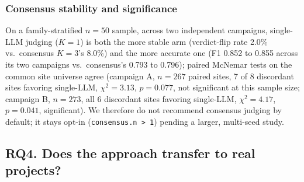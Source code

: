 \documentclass[a4paper]{llncs}
\begin{document}
\subsubsection{Consensus stability and significance}
\label{sec:eval-consensus}

On a family-stratified $n{=}50$ sample, across two independent
campaigns, single-LLM judging ($K{=}1$) is both the more stable arm
(verdict-flip rate 2.0\% vs.\ consensus $K{=}3$'s 8.0\%) and the more
accurate one (F1 0.852 to 0.855 across its two campaigns vs.\
consensus's 0.793 to 0.796); paired McNemar tests on the common site
universe agree (campaign A, $n{=}267$ paired sites, 7 of 8 discordant
sites favoring single-LLM, $\chi^2 = 3.13$, $p = 0.077$, not
significant at this sample size; campaign B, $n{=}273$, all 6
discordant sites favoring single-LLM, $\chi^2 = 4.17$, $p = 0.041$,
significant).
We
therefore do not recommend consensus judging by default; it
stays opt-in
(\texttt{consensus.n~>~1}) pending a larger, multi-seed study.

\noindent{}

\subsection{RQ4. Does the approach transfer to real projects?}
\label{sec:eval-lamed}
\end{document}
